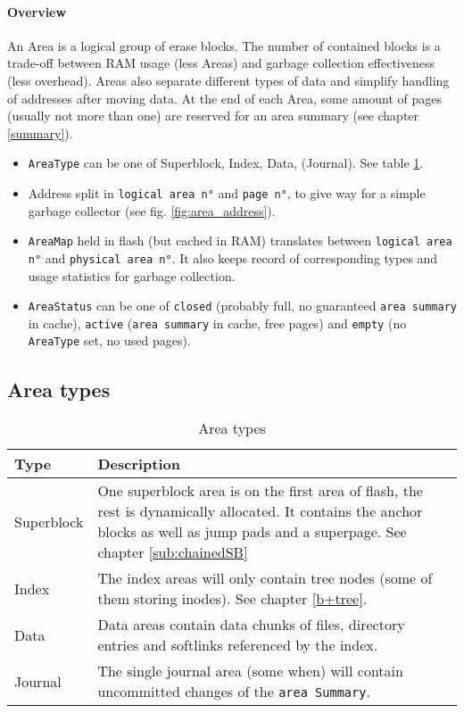\paragraph{Overview}
An Area is a logical group of erase blocks. The number of contained blocks is a trade-off between RAM usage (less Areas) and garbage collection effectiveness (less overhead). Areas also separate different types of data and simplify handling of addresses after moving data. At the end of each Area, some amount of pages (usually not more than one) are reserved for an area summary (see chapter \ref{summary}). 
\begin{itemize}
	\item \texttt{AreaType} can be one of Superblock, Index, Data, (Journal). See table \ref{tab:areatypes}.
	\item Address split in \texttt{logical area n°} and \texttt{page n°}, to give way for a simple garbage collector (see  fig. \ref{fig:area_address}).
	\item \texttt{AreaMap} held in flash (but cached in RAM) translates between \texttt{logical area n°} and \texttt{physical area n°}. It also keeps record of corresponding types and usage statistics for garbage collection.
	\item\texttt{AreaStatus} can be one of \texttt{closed} (probably full, no guaranteed \texttt{area summary} in cache), \texttt{active} (\texttt{area summary} in cache, free pages) and \texttt{empty} (no \texttt{AreaType} set, no used pages). 
\end{itemize}

\subsection{Area types}
\begin{table}[htbp]
\caption{Area types}
\label{tab:areatypes}
\begin{tabularx}{\textwidth}{lp{11cm}p{2.5cm}}
\toprule
Type & Description\\
\midrule
Superblock & One superblock area is on the first area of flash, the rest is dynamically allocated. It contains the anchor blocks as well as jump pads and a superpage. See chapter \ref{sub:chainedSB} \\
Index & The index areas will only contain tree nodes (some of them storing inodes). See chapter \ref{b+tree}.\\
Data & Data areas contain data chunks of files, directory entries and softlinks referenced by the index.\\
Journal & The single journal area (some when) will contain uncommitted changes of the \texttt{area Summary}.\\
\bottomrule
\end{tabularx}
\end{table} 

